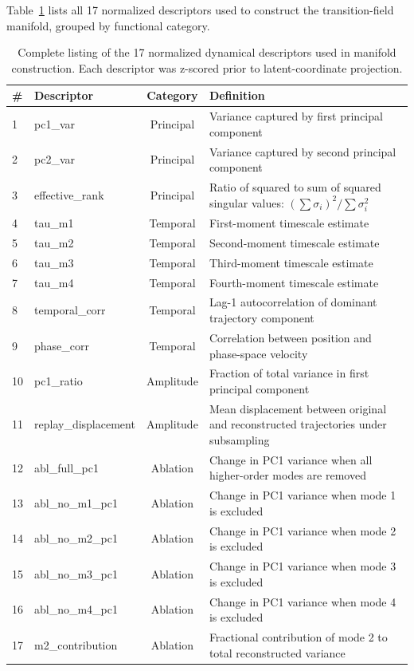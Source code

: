 \documentclass[%
 aip,
 chaos,
 amsmath,amssymb,
 reprint,
]{revtex4-2}
\begin{document}
Table~\ref{tab:descriptors} lists all 17 normalized descriptors used to construct the transition-field manifold, grouped by functional category.

\begin{table}[t]
\caption{Complete listing of the 17 normalized dynamical descriptors used in manifold construction. Each descriptor was z-scored prior to latent-coordinate projection.}
\begin{ruledtabular}
\begin{tabular}{llcp{5.5cm}}
\# & Descriptor & Category & Definition \\
\hline
1 & pc1\_var & Principal & Variance captured by first principal component \\
2 & pc2\_var & Principal & Variance captured by second principal component \\
3 & effective\_rank & Principal & Ratio of squared to sum of squared singular values: $(\sum \sigma_i)^2 / \sum \sigma_i^2$ \\
4 & tau\_m1 & Temporal & First-moment timescale estimate \\
5 & tau\_m2 & Temporal & Second-moment timescale estimate \\
6 & tau\_m3 & Temporal & Third-moment timescale estimate \\
7 & tau\_m4 & Temporal & Fourth-moment timescale estimate \\
8 & temporal\_corr & Temporal & Lag-1 autocorrelation of dominant trajectory component \\
9 & phase\_corr & Temporal & Correlation between position and phase-space velocity \\
10 & pc1\_ratio & Amplitude & Fraction of total variance in first principal component \\
11 & replay\_displacement & Amplitude & Mean displacement between original and reconstructed trajectories under subsampling \\
12 & abl\_full\_pc1 & Ablation & Change in PC1 variance when all higher-order modes are removed \\
13 & abl\_no\_m1\_pc1 & Ablation & Change in PC1 variance when mode 1 is excluded \\
14 & abl\_no\_m2\_pc1 & Ablation & Change in PC1 variance when mode 2 is excluded \\
15 & abl\_no\_m3\_pc1 & Ablation & Change in PC1 variance when mode 3 is excluded \\
16 & abl\_no\_m4\_pc1 & Ablation & Change in PC1 variance when mode 4 is excluded \\
17 & m2\_contribution & Ablation & Fractional contribution of mode 2 to total reconstructed variance \\
\end{tabular}
\end{ruledtabular}
\label{tab:descriptors}
\end{table}
\end{document}

